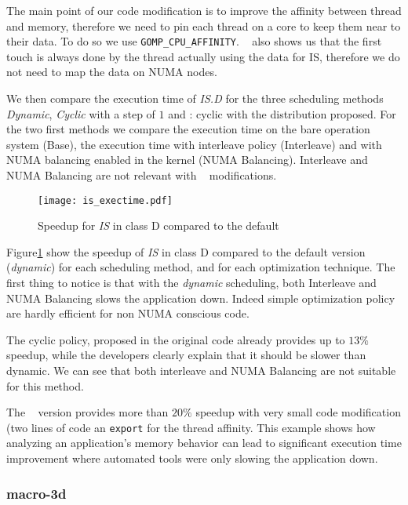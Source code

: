 The main point of our code modification is to improve the affinity between
thread and memory, therefore we need to pin each thread on a core to keep them
near to their data. To do so we use \texttt{GOMP\_CPU\_AFFINITY}. \TABARNAC~
also shows us that the first touch is always done by the thread actually using
the data for IS, therefore we do not need to map the data on NUMA nodes.

We then compare the execution time of \emph{IS.D} for the three scheduling
methods \emph{Dynamic}, \emph{Cyclic} with a step of $1$ and \TABARNAC:
cyclic with the distribution proposed. For the two first methods we compare the
execution time on the bare operation system  (Base), the execution time with
interleave policy (Interleave) and with NUMA balancing enabled in the kernel
(NUMA Balancing). Interleave and NUMA Balancing are not relevant with
\TABARNAC~ modifications.

\begin{figure}[htpb]
    \centering
    \texttt{[image: is\_exectime.pdf]}
    \caption{Speedup for \emph{IS} in class D compared to the default}
\label{fig:is-res}
\end{figure}

Figure\ref{fig:is-res} show the speedup of \emph{IS} in class D compared to
the default version (\emph{dynamic}) for each scheduling method, and for each
optimization technique. The first thing to notice is that with the
\emph{dynamic} scheduling, both Interleave and NUMA Balancing slows
the application down. Indeed simple optimization policy are hardly efficient
for non NUMA conscious code.

The cyclic policy, proposed in the original code already provides up to $13\%$
speedup, while the developers clearly explain that it should be slower than
dynamic. We can see that both interleave and NUMA Balancing are not suitable
for this method.

The \TABARNAC~ version provides more than $20\%$ speedup with very small code
modification (two lines of code an \texttt{export} for the thread affinity.
This example shows how analyzing an application's memory behavior can lead to
significant execution time improvement where automated tools were only slowing
the application down.

\subsubsection{macro-3d}
\label{sec:exp-macro3d}


